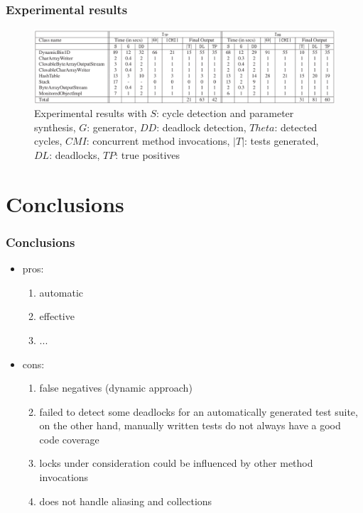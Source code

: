 \documentclass{beamer}
\begin{document}
\begin{frame}
\frametitle{Experimental results}
\begin{figure}[ht!]
    \includegraphics[scale = 0.3]{Images/er2}
    \caption{%
        Experimental results with $S$: cycle detection and parameter synthesis, $G$: generator, $DD$: deadlock detection, $Theta$: detected cycles,
        $CMI$: concurrent method invocations, $|T|$: tests generated, $DL$: deadlocks, $TP$: true positives
     }%
\end{figure}
\end{frame}

\section{Conclusions}
\begin{frame}
\frametitle{Conclusions}

    \begin{itemize}
    \item pros:
    \begin{enumerate}
      \item automatic
      \item effective
      \item ...
    \end{enumerate}
    \item cons:
    \begin{enumerate}
      \item false negatives (dynamic approach)
      \item failed to detect some deadlocks for an automatically generated test suite, on the other hand, manually written tests do not always have a good code coverage
      \item locks under consideration could be influenced by other method invocations
      \item does not handle aliasing and collections
    \end{enumerate}
    \end{itemize}

\end{frame}


\end{document}

